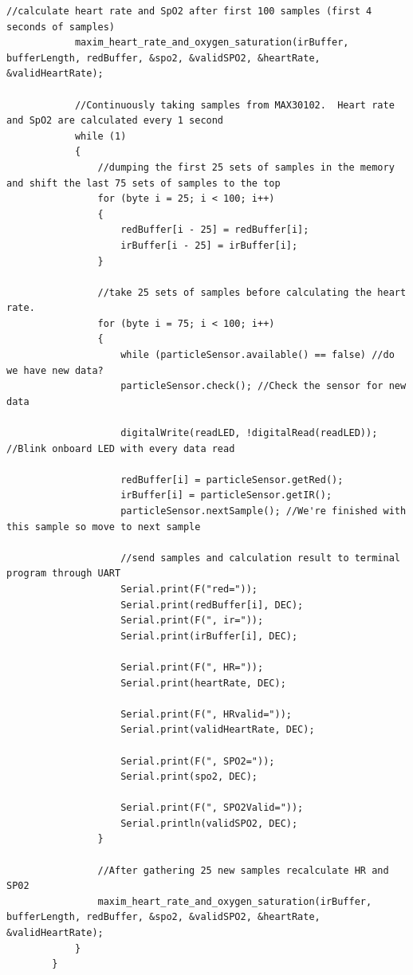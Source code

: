 \begin{flushleft}
\begin{lstlisting}[style=CStyle]
			//calculate heart rate and SpO2 after first 100 samples (first 4 seconds of samples)
			maxim_heart_rate_and_oxygen_saturation(irBuffer, bufferLength, redBuffer, &spo2, &validSPO2, &heartRate, &validHeartRate);
			
			//Continuously taking samples from MAX30102.  Heart rate and SpO2 are calculated every 1 second
			while (1)
			{
				//dumping the first 25 sets of samples in the memory and shift the last 75 sets of samples to the top
				for (byte i = 25; i < 100; i++)
				{
					redBuffer[i - 25] = redBuffer[i];
					irBuffer[i - 25] = irBuffer[i];
				}
				
				//take 25 sets of samples before calculating the heart rate.
				for (byte i = 75; i < 100; i++)
				{
					while (particleSensor.available() == false) //do we have new data?
					particleSensor.check(); //Check the sensor for new data
					
					digitalWrite(readLED, !digitalRead(readLED)); //Blink onboard LED with every data read
					
					redBuffer[i] = particleSensor.getRed();
					irBuffer[i] = particleSensor.getIR();
					particleSensor.nextSample(); //We're finished with this sample so move to next sample
					
					//send samples and calculation result to terminal program through UART
					Serial.print(F("red="));
					Serial.print(redBuffer[i], DEC);
					Serial.print(F(", ir="));
					Serial.print(irBuffer[i], DEC);
					
					Serial.print(F(", HR="));
					Serial.print(heartRate, DEC);
					
					Serial.print(F(", HRvalid="));
					Serial.print(validHeartRate, DEC);
					
					Serial.print(F(", SPO2="));
					Serial.print(spo2, DEC);
					
					Serial.print(F(", SPO2Valid="));
					Serial.println(validSPO2, DEC);
				}
				
				//After gathering 25 new samples recalculate HR and SP02
				maxim_heart_rate_and_oxygen_saturation(irBuffer, bufferLength, redBuffer, &spo2, &validSPO2, &heartRate, &validHeartRate);
			}
		}
	\end{lstlisting}
	\newpage
\end{flushleft}